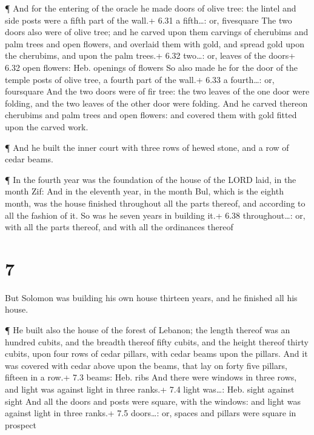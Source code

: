  ¶ And for the entering of the oracle he made doors of
olive tree: the lintel and side posts were a fifth part of the wall.+
6.31 a fifth\ldots: or, fivesquare  The two doors also were
of olive tree; and he carved upon them carvings of cherubims and palm
trees and open flowers, and overlaid them with gold, and spread gold
upon the cherubims, and upon the palm trees.+ 6.32 two\ldots: or, leaves
of the doors+ 6.32 open flowers: Heb. openings of flowers 
So also made he for the door of the temple posts of olive tree, a fourth
part of the wall.+ 6.33 a fourth\ldots: or, foursquare  And
the two doors were of fir tree: the two leaves of the one door were
folding, and the two leaves of the other door were folding.
 And he carved thereon cherubims and palm trees and open
flowers: and covered them with gold fitted upon the carved work.

 ¶ And he built the inner court with three rows of hewed
stone, and a row of cedar beams.

 ¶ In the fourth year was the foundation of the house of
the LORD laid, in the month Zif:  And in the eleventh year,
in the month Bul, which is the eighth month, was the house finished
throughout all the parts thereof, and according to all the fashion of
it. So was he seven years in building it.+ 6.38 throughout\ldots: or,
with all the parts thereof, and with all the ordinances thereof

\hypertarget{section-6}{%
\section{7}\label{section-6}}

 But Solomon was building his own house thirteen years, and
he finished all his house.

 ¶ He built also the house of the forest of Lebanon; the
length thereof was an hundred cubits, and the breadth thereof fifty
cubits, and the height thereof thirty cubits, upon four rows of cedar
pillars, with cedar beams upon the pillars.  And it was
covered with cedar above upon the beams, that lay on forty five pillars,
fifteen in a row.+ 7.3 beams: Heb. ribs  And there were
windows in three rows, and light was against light in three ranks.+ 7.4
light was\ldots: Heb. sight against sight  And all the doors
and posts were square, with the windows: and light was against light in
three ranks.+ 7.5 doors\ldots: or, spaces and pillars were square in
prospect

